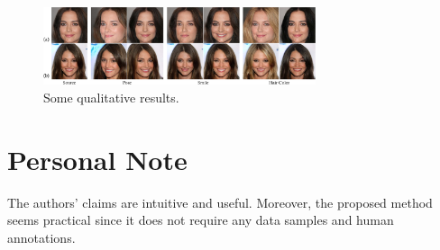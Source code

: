 \documentclass[10pt,twocolumn,letterpaper]{article}
\begin{document}
\begin{figure}[h]
	\centering
	\includegraphics[width=8cm]{assets/comparison_infogan.pdf}
	\caption{Some qualitative results.}
	\label{fig:imgs}
\end{figure}

\section{Personal Note}
The authors' claims are intuitive and useful. Moreover, the proposed method seems practical since it does not require any data samples and human annotations. 
\end{document}
